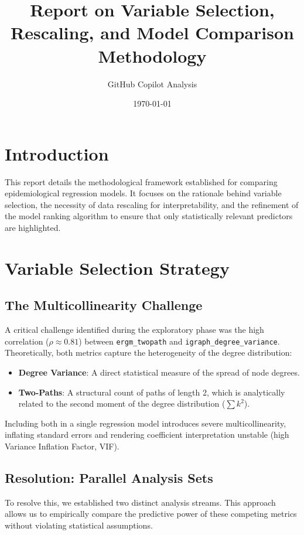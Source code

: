 \documentclass{article}
\title{Report on Variable Selection, Rescaling, and Model Comparison Methodology}
\author{GitHub Copilot Analysis}
\date{\today}
\begin{document}
\maketitle

\section{Introduction}
This report details the methodological framework established for comparing epidemiological regression models. It focuses on the rationale behind variable selection, the necessity of data rescaling for interpretability, and the refinement of the model ranking algorithm to ensure that only statistically relevant predictors are highlighted.

\section{Variable Selection Strategy}

\subsection{The Multicollinearity Challenge}
A critical challenge identified during the exploratory phase was the high correlation ($\rho \approx 0.81$) between \texttt{ergm\_twopath} and \texttt{igraph\_degree\_variance}. Theoretically, both metrics capture the heterogeneity of the degree distribution:
\begin{itemize}
    \item \textbf{Degree Variance}: A direct statistical measure of the spread of node degrees.
    \item \textbf{Two-Paths}: A structural count of paths of length 2, which is analytically related to the second moment of the degree distribution ($\sum k^2$).
\end{itemize}
Including both in a single regression model introduces severe multicollinearity, inflating standard errors and rendering coefficient interpretation unstable (high Variance Inflation Factor, VIF).

\subsection{Resolution: Parallel Analysis Sets}
To resolve this, we established two distinct analysis streams. This approach allows us to empirically compare the predictive power of these competing metrics without violating statistical assumptions.
\end{document}
